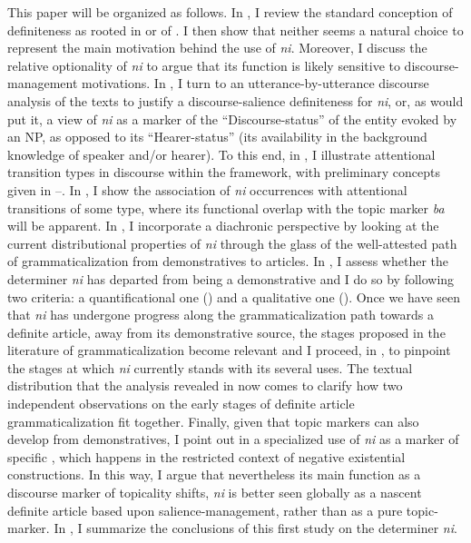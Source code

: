 \documentclass[output=paper
,modfonts
,nonflat]{langsci/langscibook}
\begin{document}
This paper will be organized as follows. In , I review the standard conception of definiteness as rooted in  or  of . I then show that neither seems a natural choice to represent the main motivation behind the use of \textit{ni}. Moreover, I discuss the relative optionality of \textit{ni} to argue that its function is likely sensitive to discourse-management motivations. In , I turn to an utterance-by-utterance discourse analysis of the texts to justify a discourse-salience definiteness for \textit{ni}, or, as \citet{WalkerPrince1996} would put it, a view of \textit{ni} as a marker of the ``Discourse-status'' of the entity evoked by an NP, as opposed to its ``Hearer-status'' (its availability in the background knowledge of speaker and/or hearer). To this end, in , I illustrate attentional transition types in  discourse within the  framework, with preliminary concepts given in --. In , I show the association of \textit{ni} occurrences with attentional transitions of some type, where its functional overlap with the topic marker \textit{ba} will be apparent. In , I incorporate a diachronic perspective by looking at the current distributional properties of \textit{ni} through the glass of the well-attested path of grammaticalization from demonstratives to articles. In , I assess whether the determiner \textit{ni} has departed from being a demonstrative and I do so by following two criteria: a quantificational one () and a qualitative one (). Once we have seen that \textit{ni} has undergone progress along the grammaticalization path towards a definite article, away from its demonstrative source, the stages proposed in the literature of grammaticalization become relevant and I proceed, in , to pinpoint the stages at which \textit{ni} currently stands with its several uses. The textual distribution that the  analysis revealed in  now comes to clarify how two independent observations on the early stages of definite article grammaticalization fit together. Finally, given that topic markers can also develop from demonstratives, I point out in  a specialized use of \textit{ni} as a marker of specific , which happens in the restricted context of negative existential constructions. In this way, I argue that nevertheless its main function as a discourse marker of topicality shifts, \textit{ni} is better seen globally as a nascent definite article based upon salience-management, rather than as a pure topic-marker. In , I summarize the conclusions of this first study on the determiner \textit{ni}. 
\end{document}
